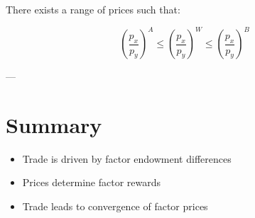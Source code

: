 There exists a range of prices such that:

\[
\left(\frac{p_x}{p_y}\right)^A \leq \left(\frac{p_x}{p_y}\right)^W \leq \left(\frac{p_x}{p_y}\right)^B
\]

---

\section{Summary}

\begin{itemize}
    \item Trade is driven by factor endowment differences
    \item Prices determine factor rewards
    \item Trade leads to convergence of factor prices
\end{itemize}